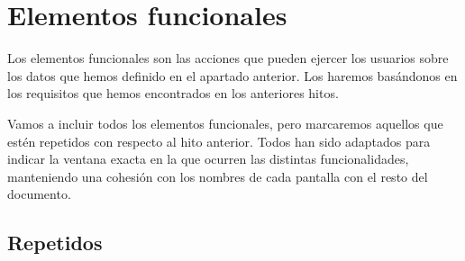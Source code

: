 \section{Elementos funcionales}

Los elementos funcionales son las acciones que pueden ejercer los usuarios
sobre los datos que hemos definido en el apartado anterior. Los haremos basándonos
en los requisitos que hemos encontrados en los anteriores hitos.

Vamos a incluir todos los elementos funcionales, pero marcaremos aquellos que estén
repetidos con respecto al hito anterior. Todos han sido adaptados para indicar la ventana exacta
en la que ocurren las distintas funcionalidades, manteniendo una cohesión con los nombres de
cada pantalla con el resto del documento.

\subsection*{Repetidos}

